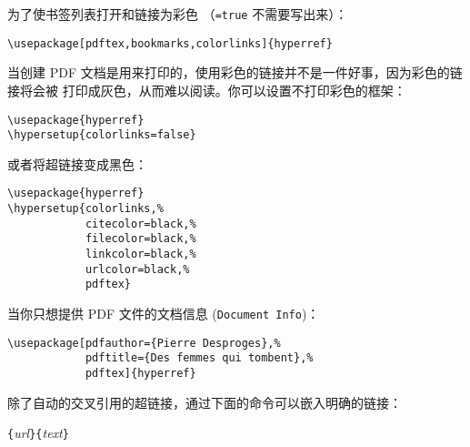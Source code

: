 
为了使书签列表打开和链接为彩色 （\texttt{=true} 不需要写出来）：
\begin{code}
\begin{verbatim}
\usepackage[pdftex,bookmarks,colorlinks]{hyperref}
\end{verbatim}
\end{code}


当创建 PDF 文档是用来打印的，使用彩色的链接并不是一件好事，因为彩色的链接将会被
打印成灰色，从而难以阅读。你可以设置不打印彩色的框架：
\begin{code}
\begin{verbatim}
\usepackage{hyperref}
\hypersetup{colorlinks=false}
\end{verbatim}
\end{code}
\noindent 或者将超链接变成黑色：
\begin{code}
\begin{verbatim}
\usepackage{hyperref}
\hypersetup{colorlinks,%
            citecolor=black,%
            filecolor=black,%
            linkcolor=black,%
            urlcolor=black,%
            pdftex}
\end{verbatim}
\end{code}


当你只想提供 PDF 文件的文档信息 (\texttt{Document Info})：
\begin{code}
\begin{verbatim}
\usepackage[pdfauthor={Pierre Desproges},%
            pdftitle={Des femmes qui tombent},%
            pdftex]{hyperref}
\end{verbatim}
\end{code}

\vspace{\baselineskip}

除了自动的交叉引用的超链接，通过下面的命令可以嵌入明确的链接：
\begin{lscommand}
\verb|{|\emph{url}\verb|}{|\emph{text}\verb|}|
\end{lscommand}

